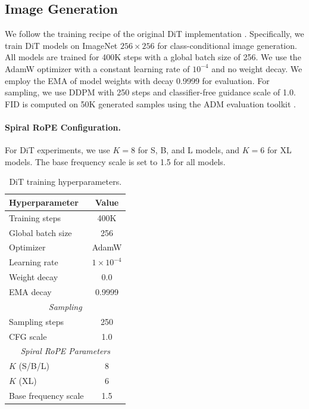 \subsection{Image Generation}

We follow the training recipe of the original DiT implementation \cite{peeblesScalableDiffusionModels2023}. Specifically, we train DiT models on ImageNet $256 \times 256$ for class-conditional image generation. All models are trained for 400K steps with a global batch size of 256. We use the AdamW optimizer with a constant learning rate of $10^{-4}$ and no weight decay. We employ the EMA of model weights with decay 0.9999 for evaluation. For sampling, we use DDPM with 250 steps and classifier-free guidance scale of 1.0.
FID is computed on 50K generated samples using the ADM evaluation toolkit \cite{dhariwalDiffusionModelsBeat2021}.

\paragraph{Spiral RoPE Configuration.} 
For DiT experiments, we use $K=8$ for S, B, and L models, and $K=6$ for XL models. The base frequency scale is set to 1.5 for all models.

\begin{table}[h]
    \caption{DiT training hyperparameters.}
    \label{tab:dit_hyperparams}
    \begin{center}
        \begin{tabular}{lc}
            \toprule
            Hyperparameter & Value \\
            \midrule
            Training steps & 400K \\
            Global batch size & 256 \\
            Optimizer & AdamW \\
            Learning rate & $1 \times 10^{-4}$ \\
            Weight decay & 0.0 \\
            EMA decay & 0.9999 \\
            \midrule
            \multicolumn{2}{c}{\textit{Sampling}} \\
            \midrule
            Sampling steps & 250 \\
            CFG scale & 1.0 \\
            \midrule
            \multicolumn{2}{c}{\textit{Spiral RoPE Parameters}} \\
            \midrule
            $K$ (S/B/L) & 8 \\
            $K$ (XL) & 6 \\
            Base frequency scale & 1.5 \\
            \bottomrule
        \end{tabular}
    \end{center}
\end{table}

